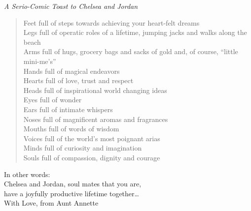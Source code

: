 {\centering
    \it A Serio-Comic Toast to Chelsea and Jordan\\
}

\begin{verse}
Feet full of steps towards achieving your heart-felt dreams\\
Legs full of operatic roles of a lifetime, jumping jacks and walks along the beach\\
Arms full of hugs, grocery bags and sacks of gold \textemdash and, of course, ``little mini-me's''\\
Hands full of magical endeavors\\
Hearts full of love, trust and respect\\
Heads full of inspirational world changing ideas\\
Eyes full of wonder\\
Ears full of intimate whispers\\
Noses full of magnificent aromas and fragrances\\
Mouths full of words of wisdom\\
Voices full of the world’s most poignant arias\\
Minds full of curiosity and imagination\\
Souls full of compassion, dignity and courage\\
\end{verse}

{\centering
    In other words:\\
    Chelsea and Jordan, soul mates that you are,\\
    have a joyfully productive lifetime together\ldots\\
    With Love, from Aunt Annette\\
}
